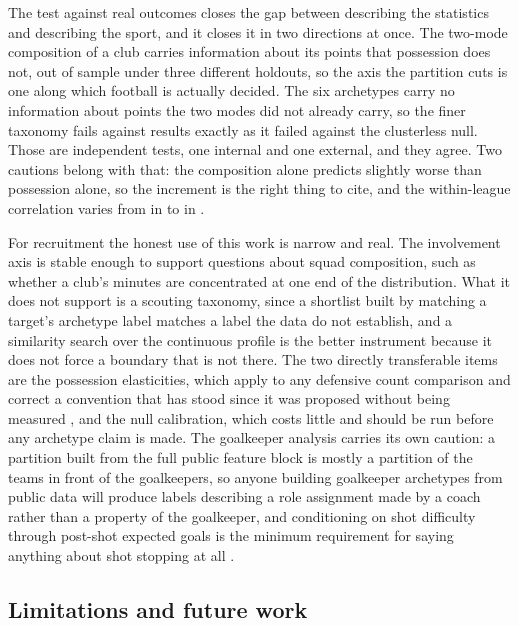 The test against real outcomes closes the gap between describing the statistics and describing the
sport, and it closes it in two directions at once. The two-mode composition of a club carries
information about its points that possession does not, out of sample under three different
holdouts, so the axis the partition cuts is one along which football is actually decided. The six
archetypes carry no information about points the two modes did not already carry, so the finer
taxonomy fails against results exactly as it failed against the clusterless null. Those are
independent tests, one internal and one external, and they agree. Two cautions belong with that:
the composition alone predicts slightly worse than possession alone, so the increment is the right
thing to cite, and the within-league correlation varies from \OutRhoLeagueMin{} in
\OutRhoLeagueMinName{} to \OutRhoLeagueMax{} in \OutRhoLeagueMaxName{}.

For recruitment the honest use of this work is narrow and real. The involvement axis is stable
enough to support questions about squad composition, such as whether a club's minutes are
concentrated at one end of the distribution. What it does not support is a scouting taxonomy,
since a shortlist built by matching a target's archetype label matches a label the data do not
establish, and a similarity search over the continuous profile is the better instrument because it
does not force a boundary that is not there. The two directly transferable items are the
possession elasticities, which apply to any defensive count comparison and correct a convention
that has stood since it was proposed without being measured \citep{knutson2014possession}, and the
null calibration, which costs little and should be run before any archetype claim is made. The
goalkeeper analysis carries its own caution: a partition built from the full public feature block
is mostly a partition of the teams in front of the goalkeepers, so anyone building goalkeeper
archetypes from public data will produce labels describing a role assignment made by a coach
rather than a property of the goalkeeper, and conditioning on shot difficulty through post-shot
expected goals is the minimum requirement for saying anything about shot stopping at all
\citep{vatvani2022upgrading}.

\subsection{Limitations and future work}

